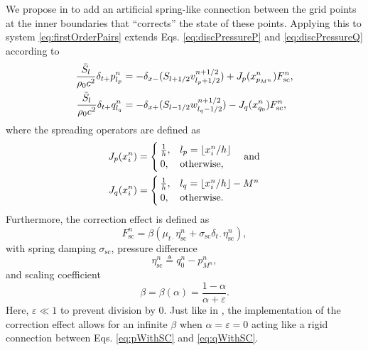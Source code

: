 We propose in \cite{Willemsen2021} to add an artificial spring-like connection between the grid points at the inner boundaries that ``corrects'' the state of these points. Applying this to system \eqref{eq:firstOrderPairs} extends Eqs. \eqref{eq:discPressureP} and \eqref{eq:discPressureQ} according to
\begin{subequations}\label{eq:pressuresWithSC}
    \begin{align}
        \frac{\bar S_{l}}{\rho_0 c^2}\delta_{t+}p_{l_p}^n &= -\delta_{x-}(S_{{l}+1/2}v_{{l_p}+1/2}^{n+1/2}) + J_p(x_{p_{M^n}}^n)F_\text{sc}^n,\label{eq:pWithSC}\\
        \frac{\bar S_{l}}{\rho_0 c^2}\delta_{t+}q_{l_q}^n &= -\delta_{x+}(S_{{l}-1/2}w_{{l_q}-1/2}^{n+1/2}) - J_q(x_{q_0}^n)F_\text{sc}^n,\label{eq:qWithSC}
    \end{align}
\end{subequations}
where the spreading operators are defined as
\begin{equation}\label{eq:spreadingOperators}
    \begin{aligned}
    J_p(x_i^n)& =
    \begin{cases}
        \frac{1}{h}, & {l_p} = \lfloor x_i^n/h\rfloor\\
        0,& \text{otherwise},
    \end{cases}
    \quad\text{and}\\
    J_q(x_i^n) &=
    \begin{cases}
        \frac{1}{h}, & {l_q} = \lfloor x_i^n/h \rfloor - M^n\\
        0,& \text{otherwise}.
    \end{cases}
\end{aligned}
\end{equation}
Furthermore, the correction effect is defined as
\begin{equation}\label{eq:scForce}
    F_\text{sc}^n = \beta\left(\mu_{t\cdot}\eta_\text{sc}^n+\sigma_\text{sc}\delta_{t\cdot}\eta_\text{sc}^n\right),
\end{equation}
with spring damping $\sigma_\text{sc}$, pressure difference
\begin{equation}
    \eta_\text{sc}^n \triangleq q_0^n - p_{M^n}^n,
\end{equation} 
and scaling coefficient
\begin{equation}\label{eq:betaDef}
    \beta = \beta(\alpha) = \frac{1-\alpha}{\alpha+\varepsilon}.
\end{equation}
Here, $\varepsilon\ll 1$ to prevent division by 0. Just like in \cite{Willemsen2021}, the implementation of the correction effect allows for an infinite $\beta$ when $\alpha = \varepsilon = 0$ acting like a rigid connection between Eqs. \eqref{eq:pWithSC} and \eqref{eq:qWithSC}.

